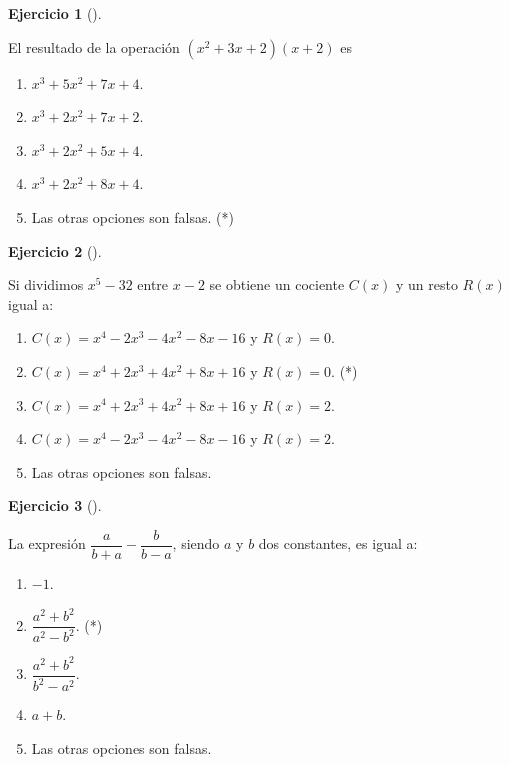 \documentclass[
  a4paper,
]{scrreport}
\theoremstyle{definition}
\newtheorem{exercise}{Ejercicio}[chapter]
\theoremstyle{remark}
\begin{document}
\begin{exercise}[]\protect\hypertarget{exr-04}{}\label{exr-04}

El resultado de la operación \((x^2+3x+2)(x+2)\) es

\begin{enumerate}
\def\labelenumi{\alph{enumi}.}
\item
  \(x^3+5x^2+7x+4\).
\item
  \(x^3+2x^2+7x+2\).
\item
  \(x^3+2x^2+5x+4\).
\item
  \(x^3+2x^2+8x+4\).
\item
  Las otras opciones son falsas. (*)
\end{enumerate}

\end{exercise}

\begin{exercise}[]\protect\hypertarget{exr-05}{}\label{exr-05}

Si dividimos \(x^5-32\) entre \(x-2\) se obtiene un cociente \(C(x)\) y
un resto \(R(x)\) igual a:

\begin{enumerate}
\def\labelenumi{\alph{enumi}.}
\item
  \(C(x) = x^4-2x^3-4x^2-8x-16\) y \(R(x)=0\).
\item
  \(C(x) = x^4+2x^3+4x^2+8x+16\) y \(R(x)=0\). (*)
\item
  \(C(x)=x^4+2x^3+4x^2+8x+16\) y \(R(x)=2\).
\item
  \(C(x)= x^4-2x^3-4x^2-8x-16\) y \(R(x)=2\).
\item
  Las otras opciones son falsas.
\end{enumerate}

\end{exercise}

\begin{exercise}[]\protect\hypertarget{exr-06}{}\label{exr-06}

La expresión \(\dfrac{a}{b+a}-\dfrac{b}{b-a}\), siendo \(a\) y \(b\) dos
constantes, es igual a:

\begin{enumerate}
\def\labelenumi{\alph{enumi}.}
\item
  \(-1\).
\item
  \(\dfrac{a^2+b^2}{a^2-b^2}\). (*)
\item
  \(\dfrac{a^2+b^2}{b^2-a^2}\).
\item
  \(a+b\).
\item
  Las otras opciones son falsas.
\end{enumerate}

\end{exercise}
\end{document}
